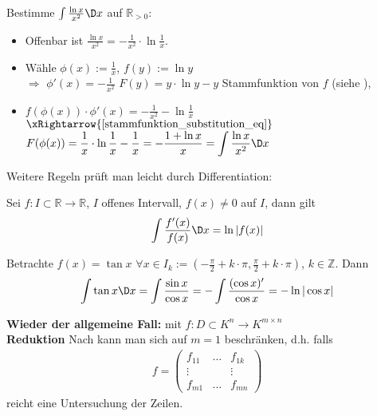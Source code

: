\begin{example}
	Bestimme $\int \frac{\ln x}{x^2} \D x$ auf $\mathbb{R}_{>0}$:
	
	\begin{itemize}
		\item Offenbar ist $\frac{\ln x}{x^2} = - \frac{1}{x^2}\cdot \ln \frac{1}{x}$.
	
		\item Wähle $\phi(x):= \frac{1}{x}$, $f(y):= \ln y$\\
		 $\Rightarrow$ $\phi'(x) = -\frac{1}{x^2}$ $F(y) = y\cdot \ln y - y$ Stammfunktion von $f$ (siehe ),
	
		\item  $f(\phi(x))\cdot \phi'(x) = - \frac{1}{x^2} - \ln \frac{1}{x}$ \\
		$\xRightarrow{\eqref{stammfunktion_substitution_eq}}$ $\displaystyle F(\phi(x)) = \frac{1}{x}\cdot \ln \frac{1}{x} - \frac{1}{x} = - \frac{1 + \ln x}{x} = \int \frac{\ln x}{x^2} \D x$
	\end{itemize}
\end{example}

Weitere Regeln prüft man leicht durch Differentiation:
\begin{proposition}
	Sei $f:I\subset \mathbb{R}\to \mathbb{R}$, $I$ offenes Intervall, $f(x)\neq 0$ auf $I$, dann gilt \begin{align}
		\int \frac{f'(x)}{f(x)} \D x = \ln \vert f(x) \vert
	\end{align}
\end{proposition}

\begin{example}
	Betrachte $f(x) = \tan x$ $\forall x\in I_k:= \left( - \frac{\pi}{2} + k\cdot \pi, \frac{\pi}{2} + k\cdot \pi\right)$, $k\in\mathbb{Z}$. Dann \begin{align*}
		\int \tan x \D x = \int \frac{\sin x}{\cos x} = - \int \frac{(\cos x)'}{\cos x} = - \ln \vert \cos x \vert
	\end{align*}
\end{example}

\textbf{Wieder der allgemeine Fall:} mit $f:D\subset K^n\to K^{m\times n}$\\

\textbf{Reduktion} Nach  kann man sich auf $m=1$ beschränken, d.h. falls \begin{align*}
		f = \begin{pmatrix}
		 f_{11} & \dotsc & f_{1k} \\ \vdots & & \vdots \\ f_{m1} & \dotsc & f_{mn}
		\end{pmatrix}
	\end{align*}
	reicht eine Untersuchung der Zeilen. \\
	

